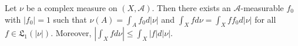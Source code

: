 Let $\nu$ be a complex measure on $(X, \mathcal{A})$. Then there exists an $\mathcal{A}$-measurable $f_0$ with $|f_0| = 1$ such that $\nu(A) = \int_A f_0 d|\nu|$ and $\int_X f d\nu = \int_X f f_0 d|\nu|$ for all $f \in \mathfrak{L}_1(|\nu|)$. Moreover, $|\int_X f d\nu| \leq \int_X |f| d|\nu|$.
